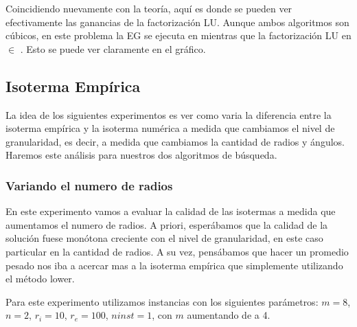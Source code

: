 Coincidiendo nuevamente con la teoría, aquí es donde se pueden ver efectivamente las ganancias de la factorización LU. Aunque ambos algoritmos son cúbicos, en este problema la EG se ejecuta en  mientras que la factorización LU en  $\in$ . Esto se puede ver claramente en el gráfico.

\newpage
\subsection{Isoterma Empírica}

La idea de los siguientes experimentos es ver como varia la diferencia entre la isoterma empírica y la isoterma numérica a medida que cambiamos el nivel de granularidad, es decir, a medida que cambiamos la cantidad de radios y ángulos. Haremos este análisis para nuestros dos algoritmos de búsqueda.

\subsubsection{Variando el numero de radios}

En este experimento vamos a evaluar la calidad de las isotermas a medida que aumentamos el numero de radios. A priori, esperábamos que la calidad de la solución fuese monótona creciente con el nivel de granularidad, en este caso particular en la cantidad de radios. A su vez, pensábamos que hacer un promedio pesado nos iba a acercar mas a la isoterma empírica que simplemente utilizando el método lower.

Para este experimento utilizamos instancias con los siguientes parámetros: $m = 8$, $n = 2$, $r_i = 10$, $r_e = 100$, $ninst = 1$, con $m$ aumentando de a 4. 

